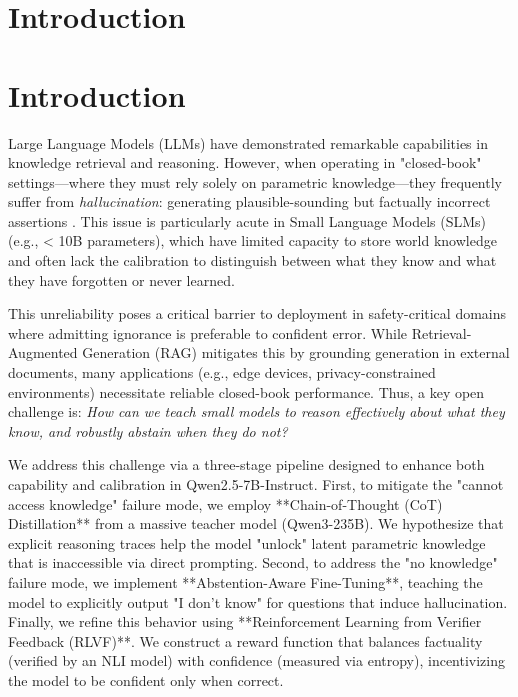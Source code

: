 \documentclass{article}
\begin{document}

\section{Introduction}
\section{Introduction}
Large Language Models (LLMs) have demonstrated remarkable capabilities in knowledge retrieval and reasoning. However, when operating in "closed-book" settings—where they must rely solely on parametric knowledge—they frequently suffer from \emph{hallucination}: generating plausible-sounding but factually incorrect assertions \cite{ji2023survey}. This issue is particularly acute in Small Language Models (SLMs) (e.g., < 10B parameters), which have limited capacity to store world knowledge and often lack the calibration to distinguish between what they know and what they have forgotten or never learned. 

This unreliability poses a critical barrier to deployment in safety-critical domains where admitting ignorance is preferable to confident error. While Retrieval-Augmented Generation (RAG) mitigates this by grounding generation in external documents, many applications (e.g., edge devices, privacy-constrained environments) necessitate reliable closed-book performance. Thus, a key open challenge is: \emph{How can we teach small models to reason effectively about what they know, and robustly abstain when they do not?}

We address this challenge via a three-stage pipeline designed to enhance both capability and calibration in Qwen2.5-7B-Instruct. First, to mitigate the "cannot access knowledge" failure mode, we employ **Chain-of-Thought (CoT) Distillation** from a massive teacher model (Qwen3-235B). We hypothesize that explicit reasoning traces help the model "unlock" latent parametric knowledge that is inaccessible via direct prompting. Second, to address the "no knowledge" failure mode, we implement **Abstention-Aware Fine-Tuning**, teaching the model to explicitly output "I don't know" for questions that induce hallucination. Finally, we refine this behavior using **Reinforcement Learning from Verifier Feedback (RLVF)**. We construct a reward function that balances factuality (verified by an NLI model) with confidence (measured via entropy), incentivizing the model to be confident only when correct.
\end{document}
